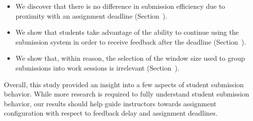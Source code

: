 \begin{itemize}
\item We discover that there is no difference in submission efficiency due to
  proximity with an assignment deadline (Section~).
\item We show that students take advantage of the ability to continue using the
  submission system in order to receive feedback after the deadline
  (Section~).
\item We show that, within reason, the selection of the window size used to
  group submissions into work sessions is irrelevant
  (Section~).
\end{itemize}

Overall, this study provided an insight into a few aspects of student
submission behavior. While more research is required to fully understand
student submission behavior, our results should help guide instructors towards
assignment configuration with respect to feedback delay and assignment
deadlines.
